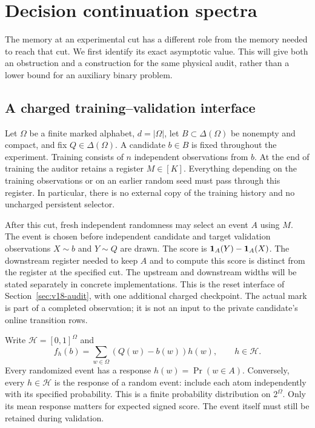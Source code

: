 \section{Decision continuation spectra}
\label{sec:v20-spectrum}
The memory at an experimental cut has a different role from the memory
needed to reach that cut. We first identify its exact asymptotic value.
This will give both an obstruction and a construction for the same physical
audit, rather than a lower bound for an auxiliary binary problem.

\subsection{A charged training--validation interface}
Let $\Omega$ be a finite marked alphabet, $d=|\Omega|$, let
$B\subset\Delta(\Omega)$ be nonempty and compact, and fix
$Q\in\Delta(\Omega)$. A candidate $b\in B$ is fixed throughout the
experiment. Training consists of $n$ independent observations from $b$.
At the end of training the auditor retains a register $M\in[K]$.
Everything depending on the training observations or on an earlier random
seed must pass through this register. In particular, there is no external
copy of the training history and no uncharged persistent selector.

After this cut, fresh independent randomness may select an event $A$ using
$M$. The event is chosen before independent candidate and target validation
observations $X\sim b$ and $Y\sim Q$ are drawn. The score is
$\mathbf 1_A(Y)-\mathbf 1_A(X)$. The downstream register needed to keep $A$ and to
compute this score is distinct from the register at the specified cut.
The upstream and downstream widths will be stated separately in concrete
implementations. This is the reset interface of
Section~\ref{sec:v18-audit}, with one additional charged checkpoint.
The actual mark is part of a completed observation; it is not an input to
the private candidate's online transition rows.

Write $\mathcal H=[0,1]^\Omega$ and
\[
 f_h(b)=\sum_{w\in\Omega}(Q(w)-b(w))h(w),\qquad h\in\mathcal H.
\]
Every randomized event has a response $h(w)=\Pr(w\in A)$. Conversely,
every $h\in\mathcal H$ is the response of a random event: include each
atom independently with its specified probability. This is a finite
probability distribution on $2^\Omega$. Only its mean response matters
for expected signed score. The event itself must still be retained during
validation.

